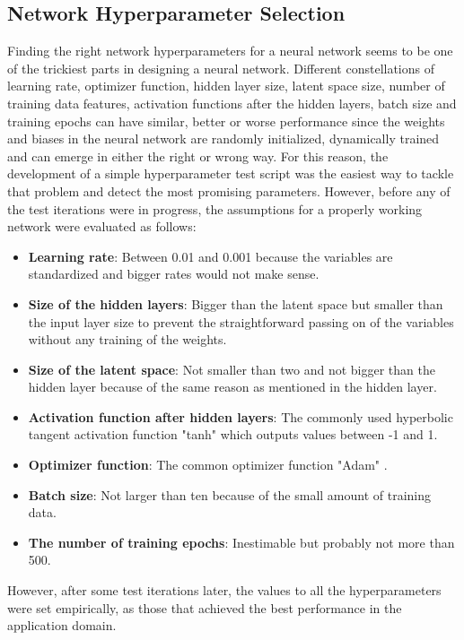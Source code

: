 \documentclass[MGS,Master,english]{twbook}%
\begin{document}
\subsection{Network Hyperparameter Selection} \label{chapter::vae::network}
Finding the right network hyperparameters for a neural network seems to be one of the trickiest parts in designing a neural network. Different constellations of learning rate, optimizer function, hidden layer size, latent space size, number of training data features, activation functions after the hidden layers, batch size and training epochs can have similar, better or worse performance since the weights and biases in the neural network are randomly initialized, dynamically trained and can emerge in either the right or wrong way. For this reason, the development of a simple hyperparameter test script was the easiest way to tackle that problem and detect the most promising parameters. However, before any of the test iterations were in progress, the assumptions for a properly working network were evaluated as follows:
\begin{itemize}
	\item \textbf{Learning rate}: Between 0.01 and 0.001 because the variables are standardized and bigger rates would not make sense.
	\item \textbf{Size of the hidden layers}: Bigger than the latent space but smaller than the input layer size to prevent the straightforward passing on of the variables without any training of the weights.
	\item \textbf{Size of the latent space}: Not smaller than two and not bigger than the hidden layer because of the same reason as mentioned in the hidden layer.
	\item \textbf{Activation function after hidden layers}: The commonly used hyperbolic tangent activation function  "tanh" which outputs values between -1 and 1. 
	\item \textbf{Optimizer function}: The common optimizer function "Adam" \cite{ml::optimizer::overview}.
	\item \textbf{Batch size}: Not larger than ten because of the small amount of training data.
	\item \textbf{The number of training epochs}: Inestimable but probably not more than 500.
\end{itemize}
However, after some test iterations later, the values to all the hyperparameters were set empirically, as those that achieved the best performance in the application domain.
\end{document}
